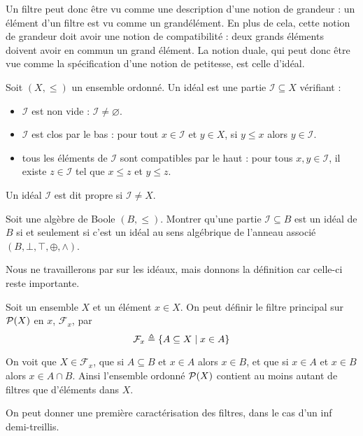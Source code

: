 Un filtre peut donc être vu comme une description d'une notion de grandeur :
un élément d'un filtre est vu comme un \og grand\fg élément. En plus de cela,
cette notion de grandeur doit avoir une notion de compatibilité : deux grands
éléments doivent avoir en commun un grand élément. La notion duale, qui peut
donc être vue comme la spécification d'une notion de petitesse, est celle
d'idéal.

\begin{definition}[Idéal]
  Soit $(X,\leq)$ un ensemble ordonné. Un idéal est une partie
  $\mathcal I \subseteq X$ vérifiant :
  \begin{itemize}
  \item $\mathcal I$ est non vide : $\mathcal I \neq\varnothing$.
  \item $\mathcal I$ est clos par le bas : pour tout $x\in \mathcal I$ et
    $y\in X$, si $y\leq x$ alors $y\in \mathcal I$.
  \item tous les éléments de $\mathcal I$ sont compatibles par le haut :
    pour tous $x,y\in \mathcal I$, il existe $z\in \mathcal I$ tel que
    $x\leq z$ et $y\leq z$.
  \end{itemize}

  Un idéal $\mathcal I$ est dit propre si $\mathcal I \neq X$.
\end{definition}

\begin{definition}
  Soit une algèbre de Boole $(B,\leq)$. Montrer qu'une partie
  $\mathcal I \subseteq B$ est un idéal de $B$ si et seulement si c'est un idéal
  au sens algébrique de l'anneau associé $(B,\bot,\top,\oplus,\land)$.
\end{definition}

Nous ne travaillerons par sur les idéaux, mais donnons la définition car
celle-ci reste importante.

\begin{example}
  Soit un ensemble $X$ et un élément $x\in X$. On peut définir le filtre
  principal sur $\mathcal{P}(X)$ en $x$, $\mathcal F_x$, par
  \[\mathcal F_x \triangleq \{A\subseteq X\mid x \in A\}\]

  On voit que $X\in \mathcal F_x$, que si $A\subseteq B$ et $x\in A$ alors
  $x\in B$, et que si $x\in A$ et $x\in B$ alors $x\in A\cap B$. Ainsi
  l'ensemble ordonné $\mathcal{P}(X)$ contient au moins autant de filtres que
  d'éléments dans $X$.
\end{example}

On peut donner une première caractérisation des filtres, dans le cas d'un
inf demi-treillis.

